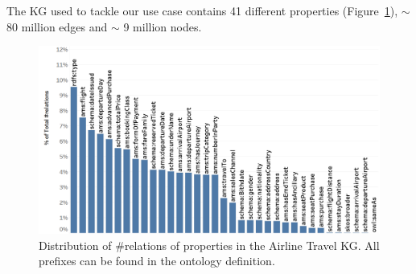 \documentclass[11pt,dvipdfm]{article}
\begin{document}
The KG used to tackle our use case contains 41 different properties (Figure~\ref{fig:properties}), $\sim$ 80 million edges and $\sim$ 9 million nodes.

\begin{figure}[h]
  \centering
  \includegraphics[width=1.05\linewidth]{figs/Properties_Distribution.png}
  \caption{Distribution of \#relations of properties in the Airline Travel KG. All prefixes can be found in the ontology definition.}
  \label{fig:properties}
\end{figure}
\end{document}
